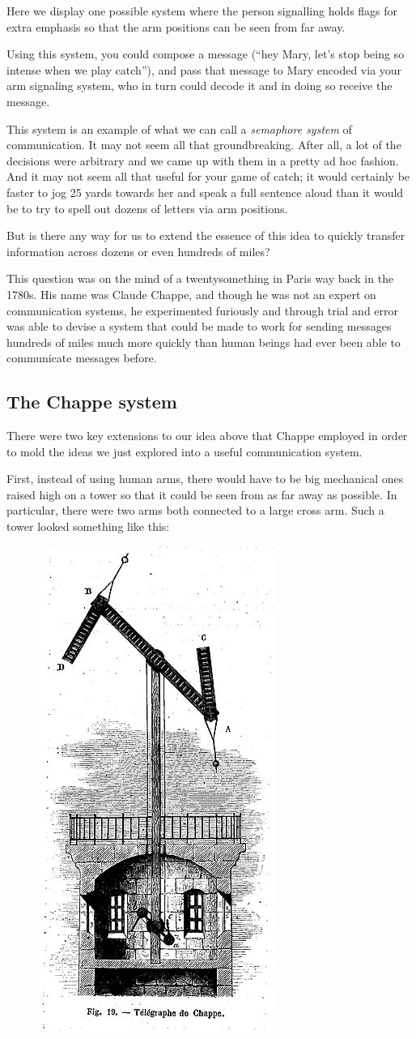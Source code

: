 \documentclass{book}
\begin{document}
Here we display one possible system where the person signalling holds flags for extra emphasis so that the arm positions can be seen from far away.

Using this system, you could compose a message (``hey Mary, let's stop being so intense when we play catch''), and pass that message to Mary encoded via your arm signaling system, who in turn could decode it and in doing so receive the message.

This system is an example of what we can call a \emph{semaphore system} of communication. It may not seem all that groundbreaking. After all, a lot of the decisions were arbitrary and we came up with them in a pretty ad hoc fashion. And it may not seem all that useful for your game of catch; it would certainly be faster to jog 25 yards towards her and speak a full sentence aloud than it would be to try to spell out dozens of letters via arm positions.

But is there any way for us to extend the essence of this idea to quickly transfer information across dozens or even hundreds of miles?

This question was on the mind of a twentysomething in Paris way back in the 1780s. His name was Claude Chappe, and though he was not an expert on communication systems, he experimented furiously and through trial and error was able to devise a system that could be made to work for sending messages hundreds of miles much more quickly than human beings had ever been able to communicate messages before.

\subsection{The Chappe system}

There were two key extensions to our idea above that Chappe employed in order to mold the ideas we just explored into a useful communication system.

First, instead of using human arms, there would have to be big mechanical ones raised high on a tower so that it could be seen from as far away as possible. In particular, there were two arms both connected to a large cross arm. Such a tower looked something like this:

\begin{figure}[H]
\centering
\includegraphics[width=0.3\linewidth]{chappe_tower}
\end{figure}
\end{document}
